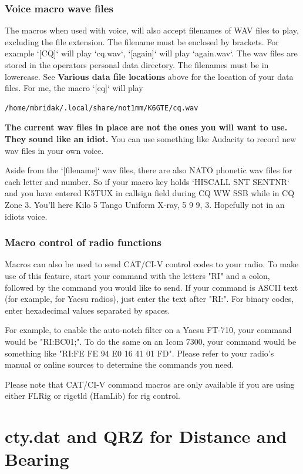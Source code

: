 \documentclass{article}
\begin{document}
\subsubsection{Voice macro wave files}
The macros when used with voice, will also accept filenames of WAV files to play, excluding the file extension. The filename must be enclosed by brackets. For example `[CQ]` will play `cq.wav`, `[again]` will play `again.wav`. The wav files are stored in the operators personal data directory. The filenames must be in lowercase. See \textbf{Various data file locations} above for the location of your data files. For me, the macro `[cq]` will play 
\begin{verbatim}/home/mbridak/.local/share/not1mm/K6GTE/cq.wav
\end{verbatim}

\textbf{The current wav files in place are not the ones you will want to use. They sound like an idiot.} You can use something like Audacity to record new wav files in your own voice.

Aside from the `[filename]` wav files, there are also NATO phonetic wav files for each letter and number. So if your macro key holds `{HISCALL} {SNT} {SENTNR}` and you have entered K5TUX in callsign field during CQ WW SSB while in CQ Zone 3. You'll here Kilo 5 Tango Uniform X-ray, 5 9 9, 3. Hopefully not in an idiots voice.
\subsubsection{Macro control of radio functions}
Macros can also be used to send CAT/CI-V control codes to your radio. To make use of this feature, start your command with the letters "RI" and a colon, followed by the command you would like to send. If your command is ASCII text (for example, for Yaesu radios), just enter the text after "RI:". For binary codes, enter hexadecimal values separated by spaces.

For example, to enable the auto-notch filter on a Yaesu FT-710, your command would be "RI:BC01;". To do the same on an Icom 7300, your command would be something like "RI:FE FE 94 E0 16 41 01 FD". Please refer to your radio's manual or online sources to determine the commands you need.

Please note that CAT/CI-V command macros are only available if you are using either FLRig or rigctld (HamLib) for rig control.

\newpage
\section{cty.dat and QRZ for Distance and Bearing}
\end{document}
